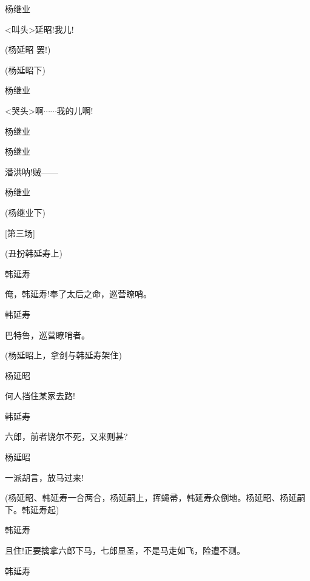 {{杨继业\hspace{20pt}~

\textless{}叫头\textgreater{}延昭!我儿!}

{(杨延昭 罢!)}

{(杨延昭下)}

{杨继业\hspace{20pt}~

\textless{}哭头\textgreater{}啊$\cdots{}\cdots{}$我的儿啊!}

{杨继业

 }

{杨继业\hspace{20pt}~

潘洪呐!贼------}

{杨继业\hspace{20pt}~

 }

{(杨继业下)}

{{[}第三场{]}}

{(丑扮韩延寿上)}

{韩延寿\hspace{20pt}~

俺，韩延寿!奉了太后之命，巡营瞭哨。}

{韩延寿\hspace{20pt}~

巴特鲁，巡营瞭哨者。}

{(杨延昭上，拿剑与韩延寿架住)}

{杨延昭\hspace{20pt}~

何人挡住某家去路!}

{韩延寿\hspace{20pt}~

六郎，前者饶尔不死，又来则甚?}

{杨延昭\hspace{20pt}~

一派胡言，放马过来!}

{(杨延昭、韩延寿一合两合，杨延嗣上，挥蝇帚，韩延寿众倒地。杨延昭、杨延嗣下。韩延寿起)}

{韩延寿

且住!正要擒拿六郎下马，七郎显圣，不是马走如飞，险遭不测。}

{韩延寿\hspace{20pt}~

}}
